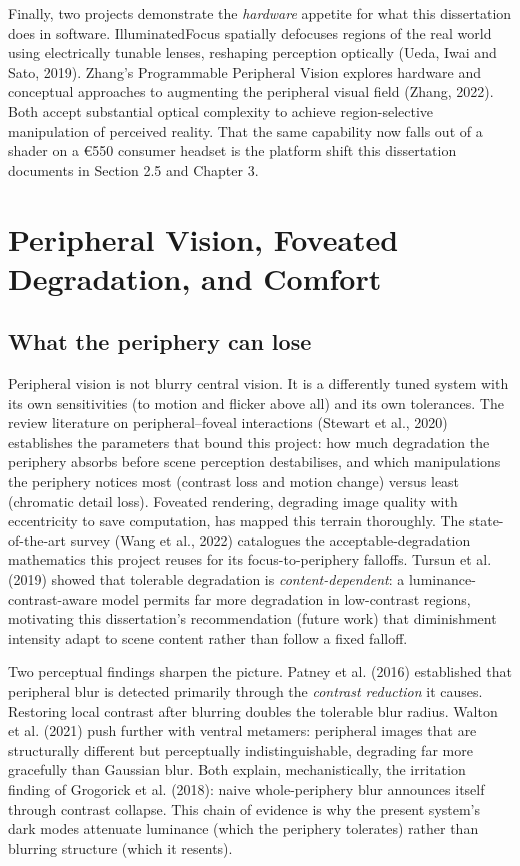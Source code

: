 Finally, two projects demonstrate the \textit{hardware} appetite for what this dissertation does in
software. IlluminatedFocus spatially defocuses regions of the real world using electrically tunable
lenses, reshaping perception optically (Ueda, Iwai and Sato, 2019). Zhang's Programmable Peripheral
Vision explores hardware and conceptual approaches to augmenting the peripheral visual field (Zhang,
2022). Both accept substantial optical complexity to achieve region-selective manipulation of
perceived reality. That the same capability now falls out of a shader on a €550 consumer headset is
the platform shift this dissertation documents in Section 2.5 and Chapter 3.

\section{Peripheral Vision, Foveated Degradation, and Comfort}

\subsection{What the periphery can lose}

Peripheral vision is not blurry central vision. It is a differently tuned system with its own
sensitivities (to motion and flicker above all) and its own tolerances. The review literature on
peripheral–foveal interactions (Stewart et al., 2020) establishes the parameters that bound
this project: how much degradation the periphery absorbs before scene perception destabilises, and
which manipulations the periphery notices most (contrast loss and motion change) versus least
(chromatic detail loss). Foveated rendering, degrading image quality with eccentricity to save
computation, has mapped this terrain thoroughly. The
state-of-the-art survey (Wang et al., 2022) catalogues the acceptable-degradation
mathematics this project reuses for its focus-to-periphery falloffs. Tursun et al. (2019) showed
that tolerable degradation is \textit{content-dependent}: a luminance-contrast-aware model permits far more
degradation in low-contrast regions, motivating this dissertation's recommendation (future work)
that diminishment intensity adapt to scene content rather than follow a fixed falloff.

Two perceptual findings sharpen the picture. Patney et al. (2016) established that peripheral blur is
detected primarily through the \textit{contrast reduction} it causes. Restoring local contrast after
blurring doubles the tolerable blur radius. Walton et al. (2021) push further with ventral metamers:
peripheral images that are structurally different but perceptually indistinguishable, degrading far
more gracefully than Gaussian blur. Both explain, mechanistically, the irritation finding of
Grogorick et al. (2018): naive whole-periphery blur announces itself through contrast collapse.
This chain of evidence is why the present system's dark
modes attenuate luminance (which the periphery tolerates) rather than blurring structure (which it
resents).

